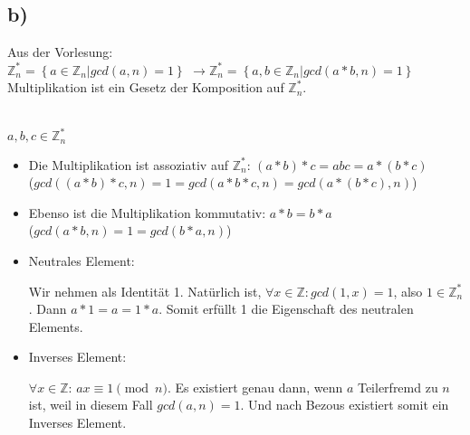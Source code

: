 \documentclass[12pt,pdftex,a4paper]{article}
\begin{document}
\subsection*{b)}

Aus der Vorlesung:\\
$ \mathds{Z}^*_n = \left\lbrace  a \in \mathds{Z}_n | gcd(a, n) = 1 \right\rbrace $
$ \rightarrow \mathds{Z}^*_n = \left\lbrace  a, b \in \mathds{Z}_n | gcd(a*b, n) = 1 \right\rbrace $\\
Multiplikation ist ein Gesetz der Komposition auf $ \mathds{Z}^*_n $.


~\\
$ a, b, c \in  \mathds{Z}^*_n $
\begin{itemize}
	\item Die Multiplikation ist assoziativ auf $ \mathds{Z}^*_n $:
	$ ( a * b ) * c =abc= a * ( b * c) $\\
	($ gcd((a*b)*c, n) = 1 = gcd(a*b*c, n) = gcd(a*(b*c), n) $)
	
	
	
	\item Ebenso ist die Multiplikation kommutativ: $ a*b = b*a $\\
	($ gcd(a*b, n) = 1 = gcd(b*a, n) $)
	
	
	
	\item Neutrales Element:
	
	Wir nehmen als Identität 1. Natürlich ist, $ \forall x \in  \mathds{Z} : gcd(1, x) = 1 $, also $ 1 \in \mathds{Z}^*_n $. Dann $ a * 1 = a = 1 * a $. Somit erfüllt 1 die Eigenschaft des neutralen Elements.
	
	
	
	\item Inverses Element: %
	
	$ \forall x \in  \mathds{Z} $: 
	$ ax \equiv 1 \pmod{n} $. Es existiert genau dann, wenn $ a $ Teilerfremd zu $ n $ ist, weil in diesem Fall $ gcd(a, n) = 1 $. Und nach Bezous existiert somit ein Inverses Element.
	 
\end{itemize}
\end{document}
